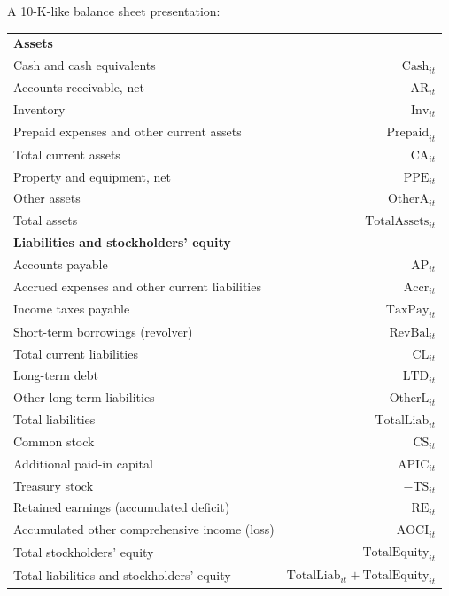 \documentclass[11pt]{article}
\begin{document}
A 10-K-like balance sheet presentation:
\begin{center}
\begin{tabular}{l r}
\toprule
\textbf{Assets} & \\
Cash and cash equivalents & $\text{Cash}_{it}$\\
Accounts receivable, net & $\text{AR}_{it}$\\
Inventory & $\text{Inv}_{it}$\\
Prepaid expenses and other current assets & $\text{Prepaid}_{it}$\\
\midrule
Total current assets & $\text{CA}_{it}$\\
Property and equipment, net & $\text{PPE}_{it}$\\
Other assets & $\text{OtherA}_{it}$\\
\midrule
Total assets & $\text{TotalAssets}_{it}$\\
\midrule
\textbf{Liabilities and stockholders' equity} & \\
Accounts payable & $\text{AP}_{it}$\\
Accrued expenses and other current liabilities & $\text{Accr}_{it}$\\
Income taxes payable & $\text{TaxPay}_{it}$\\
Short-term borrowings (revolver) & $\text{RevBal}_{it}$\\
\midrule
Total current liabilities & $\text{CL}_{it}$\\
Long-term debt & $\text{LTD}_{it}$\\
Other long-term liabilities & $\text{OtherL}_{it}$\\
\midrule
Total liabilities & $\text{TotalLiab}_{it}$\\
\midrule
Common stock & $\text{CS}_{it}$\\
Additional paid-in capital & $\text{APIC}_{it}$\\
Treasury stock & $-\text{TS}_{it}$\\
Retained earnings (accumulated deficit) & $\text{RE}_{it}$\\
Accumulated other comprehensive income (loss) & $\text{AOCI}_{it}$\\
\midrule
Total stockholders' equity & $\text{TotalEquity}_{it}$\\
\midrule
Total liabilities and stockholders' equity & $\text{TotalLiab}_{it}+\text{TotalEquity}_{it}$\\
\bottomrule
\end{tabular}
\end{center}
\end{document}

